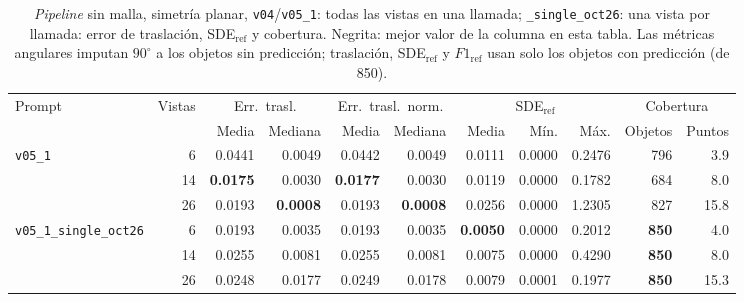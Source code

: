 \begin{table}[htbp]
\centering
\caption{\textit{Pipeline} sin malla, simetría planar, \texttt{v04}/\texttt{v05\_1}: todas las vistas en una llamada; \texttt{\_single\_oct26}: una vista por llamada: error de traslación, SDE$_{\mathrm{ref}}$ y cobertura. Negrita: mejor valor de la columna en esta tabla. Las métricas angulares imputan $90^\circ$ a los objetos sin predicción; traslación, SDE$_{\mathrm{ref}}$ y $F1_{\mathrm{ref}}$ usan solo los objetos con predicción (de 850).}
\label{tab:plane_modo_envio_posicion}
\begin{adjustbox}{max width=\textwidth}
\begin{tabular}{lrrrrrrrrrr}
\toprule
\multirow{2}{*}{Prompt} & \multirow{2}{*}{Vistas} & \multicolumn{2}{c}{Err.\ trasl.} & \multicolumn{2}{c}{Err.\ trasl.\ norm.} & \multicolumn{3}{c}{SDE$_{\mathrm{ref}}$} & \multicolumn{2}{c}{Cobertura} \\
\cmidrule(lr){3-4} \cmidrule(lr){5-6} \cmidrule(lr){7-9} \cmidrule(lr){10-11}
 &  & Media & Mediana & Media & Mediana & Media & Mín. & Máx. & Objetos & Puntos \\
\midrule
\multirow{3}{*}{\texttt{v05\_1}} & 6 & 0.0441 & 0.0049 & 0.0442 & 0.0049 & 0.0111 & 0.0000 & 0.2476 & 796 & 3.9 \\
 & 14 & \textbf{0.0175} & 0.0030 & \textbf{0.0177} & 0.0030 & 0.0119 & 0.0000 & 0.1782 & 684 & 8.0 \\
 & 26 & 0.0193 & \textbf{0.0008} & 0.0193 & \textbf{0.0008} & 0.0256 & 0.0000 & 1.2305 & 827 & 15.8 \\
\midrule
\multirow{3}{*}{\texttt{v05\_1\_single\_oct26}} & 6 & 0.0193 & 0.0035 & 0.0193 & 0.0035 & \textbf{0.0050} & 0.0000 & 0.2012 & \textbf{850} & 4.0 \\
 & 14 & 0.0255 & 0.0081 & 0.0255 & 0.0081 & 0.0075 & 0.0000 & 0.4290 & \textbf{850} & 8.0 \\
 & 26 & 0.0248 & 0.0177 & 0.0249 & 0.0178 & 0.0079 & 0.0001 & 0.1977 & \textbf{850} & 15.3 \\
\bottomrule
\end{tabular}
\end{adjustbox}
\end{table}

